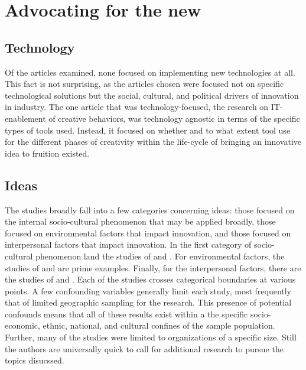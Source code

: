 \section{Advocating for the new}

\subsection{Technology}

Of the articles examined, none focused on implementing new technologies at all. This fact is not surprising, as the articles chosen were focused not on specific technological solutions but the social, cultural, and political drivers of innovation in industry. The one article that was technology-focused, the \textcite{nevoExploringRoleIT2020} research on IT-enablement of creative behaviors, was technology agnostic in terms of the specific types of tools used. Instead, it focused on whether and to what extent tool use for the different phases of creativity within the life-cycle of bringing an innovative idea to fruition existed.

\subsection{Ideas}

The studies broadly fall into a few categories concerning ideas: those focused on the internal socio-cultural phenomenon that may be applied broadly, those focused on environmental factors that impact innovation, and those focused on interpersonal factors that impact innovation. In the first category of socio-cultural phenomenon land the studies of \textcite{bagKeyResourcesIndustry2021r} and \textcite{matsuzakiInnovationUpgradingLocal2020}. For environmental factors, the studies of \textcite{matsuzakiInnovationUpgradingLocal2020,nevoExploringRoleIT2020,tortorellaOrganizationalLearningPaths2020, aliEmpiricalStudyExplore2019} and \textcite{xieLeadershipStyleInnovation2018} are prime examples. Finally, for the interpersonal factors, there are the studies of \textcite{zhaoCharismaticLeadershipMillennial2021,chukwuemekak.echebiriEmpiricalStudyIndividualLevel2020,ahmadImpactWorkplaceInformation2020} and \textcite{isadaEmpiricalStudyRegarding2017}.  Each of the studies crosses categorical boundaries at various points. A few confounding variables generally limit each study, most frequently that of limited geographic sampling for the research. This presence of potential confounds means that all of these results exist within a the specific socio-economic, ethnic, national, and cultural confines of the sample population. Further, many of the studies were limited to organizations of a specific size. Still the authors are universally quick to call for additional research to pursue the topics disucssed.

